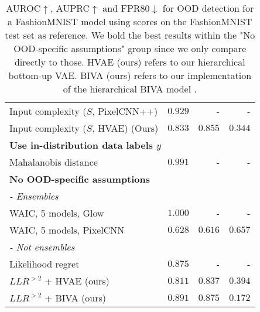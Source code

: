 \begin{table}[t!]
{\begin{tabular}{lrrr}
Input complexity ($S$, PixelCNN++) \cite{serra_input_2020}             & $0.929$ & - & - \\
Input complexity ($S$, HVAE) (Ours) \cite{serra_input_2020}\footnotemark & $0.833$ & $0.855$ & $0.344$ \\
         \multicolumn{4}{l}{\textbf{Use in-distribution data labels $y$}} \\
Mahalanobis distance {\cite{lee_simple_2018}}                          & $0.991$ & - & -  \\
         \multicolumn{4}{l}{\textbf{No OOD-specific assumptions}} \\
         \multicolumn{4}{l}{\textit{- Ensembles}} \\
WAIC, 5 models, Glow {\cite{choi_waic_2019}}                          & $1.000$ & - & - \\
WAIC, 5 models, PixelCNN {\cite{ren_likelihood_2019}}                      & $0.628$ & $0.616$ & $0.657$ \\
         \multicolumn{4}{l}{\textit{- Not ensembles}} \\
Likelihood regret \cite{xiao_likelihood_2020}                               & $0.875$ & - & - \\
$LLR^{>2}$ + HVAE (ours)                            & $0.811$ & $0.837$ & $0.394$ \\
$LLR^{>2}$ + BIVA (ours)                            & $\mathbf{0.891}$ & $\mathbf{0.875}$ & $\mathbf{0.172}$ \\
         \bottomrule
    \end{tabular}%
    }
    \caption{%
        AUROC$\uparrow$, AUPRC$\uparrow$ and FPR80$\downarrow$ for OOD detection for a FashionMNIST model using scores on the FashionMNIST test set as reference. We bold the best results within the "No OOD-specific assumptions" group since we only compare directly to those.
        HVAE (ours) refers to our hierarchical bottom-up VAE.
        BIVA (ours) refers to our implementation of the hierarchical BIVA model \cite{maaloe_biva_2019}.
    }
    \label{tab:rocauc-ood}
\end{table}


